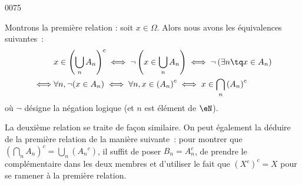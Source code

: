 
\begin{corrige}{0075}

Montrons la première relation : soit $x \in \Omega$. Alors nous avons les équivalences suivantes~:
\begin{equation*}
  \begin{split}
    & x \in {\left(\bigcup_nA_n\right)}^c \iff \neg \left( x \in
      \bigcup_nA_n \right) \iff \neg \left( \exists n \tq x \in
      A_n \right)\\
    \iff & \forall n, \neg (x \in A_n)\iff \forall n, x \in
    \left(A_n\right)^c \iff x \in \bigcap_n \left(A_n\right)^c
  \end{split}
\end{equation*}
où $\neg$ désigne la négation logique (et $n$ est élément de $\eN$).

La deuxième relation se traite de façon similaire. On peut également la déduire de la première relation de la manière suivante~: pour montrer que ${\left(\bigcap_n A_n\right)}^c = \bigcup_n ({A_n}^c)$, il suffit de poser $B_n = A_n^c$, de prendre le complémentaire dans les deux membres et d'utiliser le fait que ${(X^c)}^c = X$ pour se ramener à la première relation.


\end{corrige}
